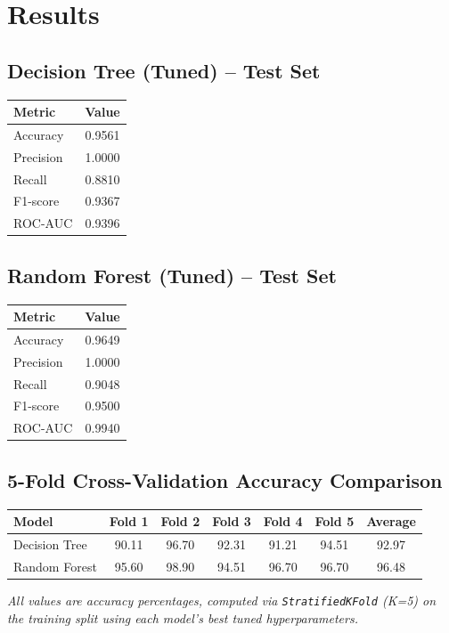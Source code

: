 \documentclass[12pt,a4paper]{article}
\begin{document}
\section{Results}

\subsection*{Decision Tree (Tuned) -- Test Set}
\begin{tabular}{lc}
\toprule
Metric & Value\\
\midrule
Accuracy & 0.9561 \\
Precision & 1.0000 \\
Recall & 0.8810 \\
F1-score & 0.9367 \\
ROC-AUC & 0.9396 \\
\bottomrule
\end{tabular}

\subsection*{Random Forest (Tuned) -- Test Set}
\begin{tabular}{lc}
\toprule
Metric & Value\\
\midrule
Accuracy & 0.9649 \\
Precision & 1.0000 \\
Recall & 0.9048 \\
F1-score & 0.9500 \\
ROC-AUC & 0.9940 \\
\bottomrule
\end{tabular}

\subsection*{5-Fold Cross-Validation Accuracy Comparison}
\begin{longtable}{lcccccc}
\toprule
Model & Fold 1 & Fold 2 & Fold 3 & Fold 4 & Fold 5 & Average \\
\midrule
Decision Tree & 90.11 & 96.70 & 92.31 & 91.21 & 94.51 & 92.97 \\
Random Forest & 95.60 & 98.90 & 94.51 & 96.70 & 96.70 & 96.48 \\
\bottomrule
\end{longtable}
\textit{All values are accuracy percentages, computed via \texttt{StratifiedKFold} (K=5) on the
training split using each model's best tuned hyperparameters.}
\end{document}
